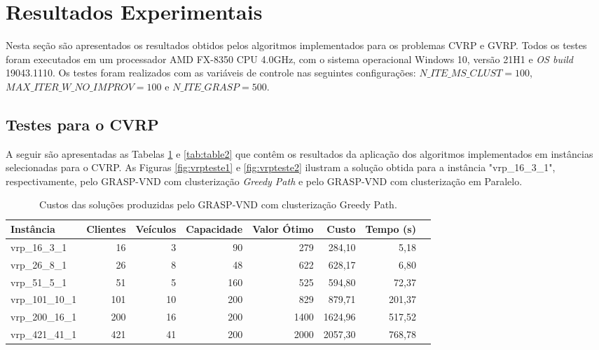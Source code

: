 \documentclass[12pt, a4paper]{article}
\begin{document}
\section{Resultados Experimentais}\label{sec:resultados}

Nesta seção são apresentados os resultados obtidos pelos algoritmos implementados para os problemas CVRP e GVRP. Todos os testes foram executados em um processador AMD FX-8350 CPU 4.0GHz, com o sistema operacional Windows 10, versão 21H1 e \textit{OS build} 19043.1110. Os testes foram realizados com as variáveis de controle nas seguintes configurações: $ \textit{N\_ITE\_MS\_CLUST} = 100$,  $ \textit{MAX\_ITER\_W\_NO\_IMPROV} = 100 $ e $ \textit{N\_ITE\_GRASP} = 500$.


\subsection{Testes para o CVRP}

A seguir são apresentadas as Tabelas \ref{tab:table1} e \ref{tab:table2} que contêm os resultados da aplicação dos algoritmos implementados em instâncias selecionadas para o CVRP. As Figuras \ref{fig:vrpteste1} e \ref{fig:vrpteste2} ilustram a solução obtida para a instância "vrp\_16\_3\_1", respectivamente, pelo GRASP-VND com clusterização \textit{Greedy Path} e pelo GRASP-VND com clusterização em Paralelo.\par
%
\begin{table}[htb!]
  \begin{center}
    \begin{tabular}{l|r|r|r|r|r|r|r}
      \toprule %
      \textbf{Instância} & \textbf{Clientes} & \textbf{Veículos} & \textbf{Capacidade} & \textbf{Valor Ótimo} & \textbf{Custo} & \textbf{Tempo (s)}\\
      \midrule %
      vrp\_16\_3\_1 & 16 & 3 & 90 & 279 & 284,10 & 5,18\\
      vrp\_26\_8\_1 & 26 & 8 & 48 & 622 & 628,17 & 6,80\\ 
      vrp\_51\_5\_1 & 51 & 5 & 160 & 525 & 594,80 & 72,37 \\
      vrp\_101\_10\_1 & 101 & 10 & 200 & 829 & 879,71 & 201,37\\
      vrp\_200\_16\_1 & 200 & 16 & 200 & 1400 & 1624,96 & 517,52\\
      vrp\_421\_41\_1 & 421 & 41 & 200 & 2000 & 2057,30 & 768,78\\
      \bottomrule %
    \end{tabular}
    \caption{Custos das soluções produzidas pelo GRASP-VND com clusterização Greedy Path.}
    \label{tab:table1}
  \end{center}
\end{table}
\end{document}
